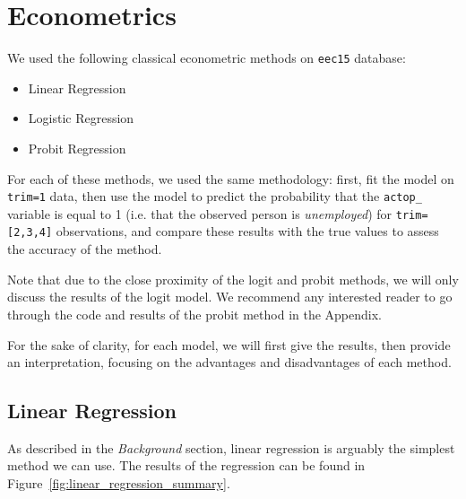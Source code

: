 \section{Econometrics}
We used the following classical econometric methods on \texttt{eec15} database:

\begin{itemize}
    \item Linear Regression
    \item Logistic Regression
    \item Probit Regression
\end{itemize}

For each of these methods, we used the same methodology: first, fit the model on \texttt{trim=1} data, then use the model to predict the probability that the \texttt{actop\_} variable is equal to 1 (i.e. that the observed person is \textit{unemployed}) for \texttt{trim=[2,3,4]} observations, and compare these results with the true values to assess the accuracy of the method.

Note that due to the close proximity of the logit and probit methods, we will only discuss the results of the logit model. We recommend any interested reader to go through the code and results of the probit method in the Appendix.

For the sake of clarity, for each model, we will first give the results, then provide an interpretation, focusing on the advantages and disadvantages of each method.

\subsection{Linear Regression}
As described in the \textit{Background} section, linear regression is arguably the simplest method we can use. The results of the regression can be found in Figure~\ref{fig:linear_regression_summary}.

